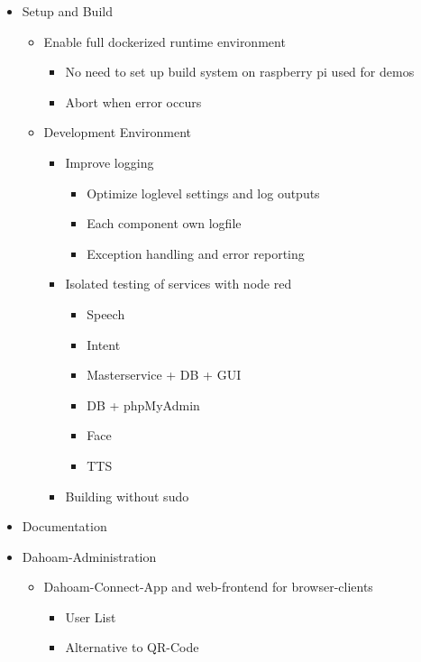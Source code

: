 \documentclass[12pt]{article}
\theoremstyle{definition}
\begin{document}
\begin{itemize}
    \item Setup and Build
    \begin{itemize}
        \item Enable full dockerized runtime environment
        \begin{itemize}
            \item No need to set up build system on raspberry pi used for demos
            \item Abort when error occurs
        \end{itemize}
        \item Development Environment
        \begin{itemize}
            \item Improve logging
            \begin{itemize}
                \item Optimize loglevel settings and log outputs
                \item Each component own logfile
                \item Exception handling and error reporting 
            \end{itemize}
            \item Isolated testing of services with node red
            \begin{itemize}
                \item Speech
                \item Intent
                \item Masterservice + DB + GUI
                \item DB + phpMyAdmin
                \item Face
                \item TTS
            \end{itemize}
            \item Building without sudo
        \end{itemize}
    \end{itemize}
    \item Documentation
    \item Dahoam-Administration
    \begin{itemize}
        \item Dahoam-Connect-App and web-frontend for browser-clients
        \begin{itemize}
            \item User List
            \item Alternative to QR-Code

\end{itemize}
\end{itemize}
\end{itemize}
\end{document}
